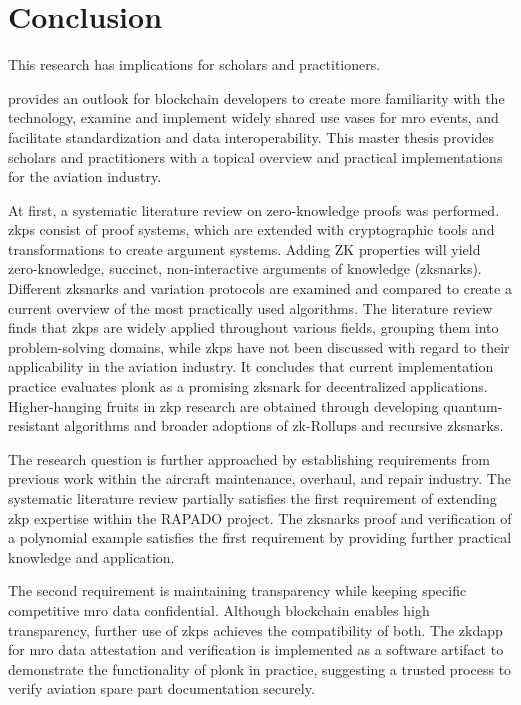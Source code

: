 \chapter{Conclusion}
This research has implications for scholars and practitioners. 

\citet{efthymiou} provides an outlook for blockchain developers to create more familiarity with the technology, examine and implement widely shared use vases for \acrshort{mro} events, and facilitate standardization and data interoperability. This master thesis provides scholars and practitioners with a topical overview and practical implementations for the aviation industry.

At first, a systematic literature review on zero-knowledge proofs was performed. \acrshort{zkp}s consist of proof systems, which are extended with cryptographic tools and transformations to create argument systems. Adding ZK properties will yield zero-knowledge, succinct, non-interactive arguments of knowledge (\acrshort{zksnark}s). Different \acrshort{zksnark}s and variation protocols are examined and compared to create a current overview of the most practically used algorithms. The literature review finds that \acrshort{zkp}s are widely applied throughout various fields, grouping them into problem-solving domains, while \acrshort{zkp}s have not been discussed with regard to their applicability in the aviation industry. It concludes that current implementation practice evaluates \acrshort{plonk} as a promising \acrshort{zksnark} for decentralized applications. Higher-hanging fruits in \acrshort{zkp} research are obtained through developing quantum-resistant algorithms and broader adoptions of zk-Rollups and recursive \acrshort{zksnark}s.

The research question is further approached by establishing requirements from previous work within the aircraft maintenance, overhaul, and repair industry. The systematic literature review partially satisfies the first requirement of extending \acrshort{zkp} expertise within the RAPADO project. The \acrshort{zksnark}s proof and verification of a polynomial example satisfies the first requirement by providing further practical knowledge and application. 

The second requirement is maintaining transparency while keeping specific competitive \acrshort{mro} data confidential. Although blockchain enables high transparency, further use of \acrshort{zkp}s achieves the compatibility of both. The \acrshort{zkdapp} for \acrshort{mro} data attestation and verification is implemented as a software artifact to demonstrate the functionality of \acrshort{plonk} in practice, suggesting a trusted process to verify aviation spare part documentation securely. 

